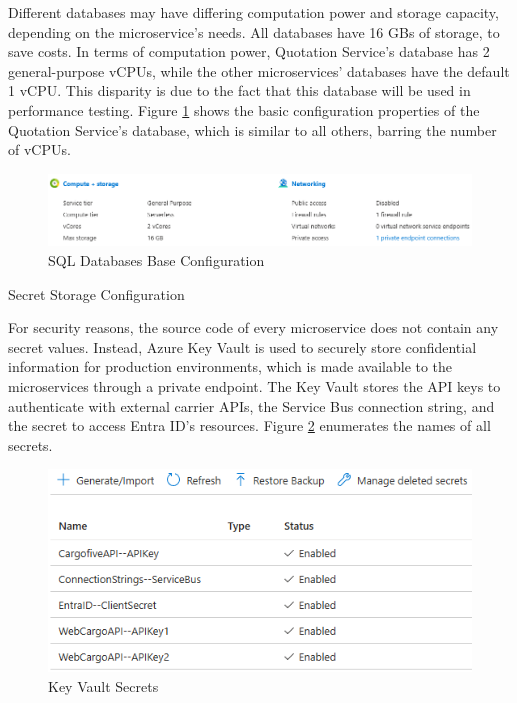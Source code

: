 \documentclass[12pt, reqno]{amsbook}
\makeatletter
\def\subsection{\@startsection{subsection}{2}%
      \z@{.5\linespacing\@plus.7\linespacing}{.25\linespacing}%
      {\normalfont\bfseries\flushleft}}
\theoremstyle{definition}
\theoremstyle{definition}
\numberwithin{section}{chapter}
\numberwithin{table}{chapter}
\numberwithin{figure}{chapter}
\makeatother
\begin{document}
Different databases may have differing computation power and storage capacity, depending on the microservice's needs. All databases have 16 \acp{GB} of storage, to save costs. In terms of computation power, Quotation Service's database has 2 general-purpose \acp{vCPU}, while the other microservices' databases have the default 1 \ac{vCPU}. This disparity is due to the fact that this database will be used in performance testing. Figure \ref{Figure:DatabaseConfigurationBase} shows the basic configuration properties of the Quotation Service's database, which is similar to all others, barring the number of \acp{vCPU}.

\begin{figure}[H]
  \centering
  \includegraphics[width=0.9\linewidth]{images/DatabaseConfigurationBase.png}
  \caption{\label{Figure:DatabaseConfigurationBase}SQL Databases Base Configuration}
\end{figure}

\subsection{Secret Storage Configuration}

For security reasons, the source code of every microservice does not contain any secret values. Instead, Azure Key Vault is used to securely store confidential information for production environments, which is made available to the microservices through a private endpoint. The Key Vault stores the \ac{API} keys to authenticate with external carrier \acp{API}, the Service Bus connection string, and the secret to access Entra ID's resources. Figure \ref{Figure:KeyVaultSecrets} enumerates the names of all secrets.

\begin{figure}[H]
  \centering
  \includegraphics[width=0.8\linewidth]{images/KeyVaultSecrets.png}
  \caption{\label{Figure:KeyVaultSecrets}Key Vault Secrets}
\end{figure}
\end{document}
